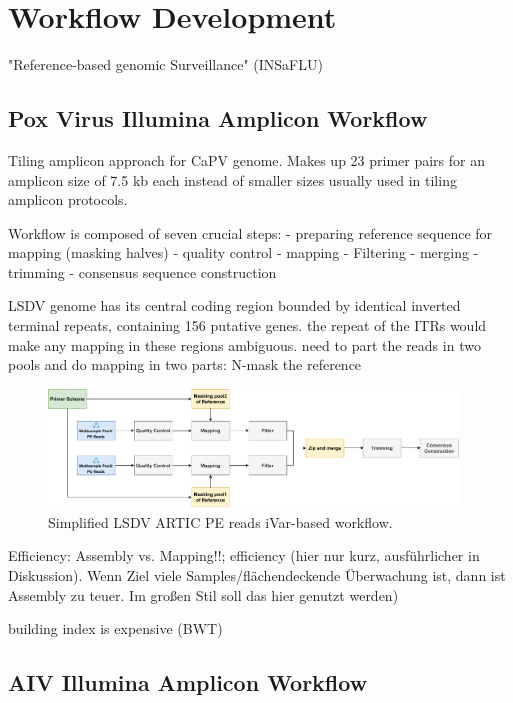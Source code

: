 \section{Workflow Development}
"Reference-based genomic Surveillance" (INSaFLU)

\subsection{Pox Virus Illumina Amplicon Workflow}

Tiling amplicon approach for CaPV genome. Makes up 23 primer pairs for an amplicon size of 7.5 kb each instead of smaller sizes usually used in tiling amplicon protocols.

Workflow is composed of seven crucial steps:
- preparing reference sequence for mapping (masking halves)
- quality control
- mapping
- Filtering
- merging
- trimming
- consensus sequence construction

LSDV genome has its central coding region bounded by identical inverted terminal repeats,
containing 156 putative genes. the repeat of the ITRs would make any mapping in these regions ambiguous.
need to part the reads in two pools and do mapping in two parts: N-mask the  reference 

\begin{figure}
	\centering
	\includegraphics[width=0.97\textwidth]{media/workflow-diagrams/pipelines-LSDV.pdf}
	\caption{Simplified LSDV ARTIC PE reads iVar-based workflow.}
	\label{fig:wf-lsdv}
\end{figure}

Efficiency: Assembly vs. Mapping!!; efficiency (hier nur kurz, ausführlicher in Diskussion). Wenn Ziel viele Samples/flächendeckende Überwachung ist, dann ist Assembly zu teuer. Im großen Stil soll das hier genutzt werden)

building index is expensive (BWT)

\subsection{AIV Illumina Amplicon Workflow}

